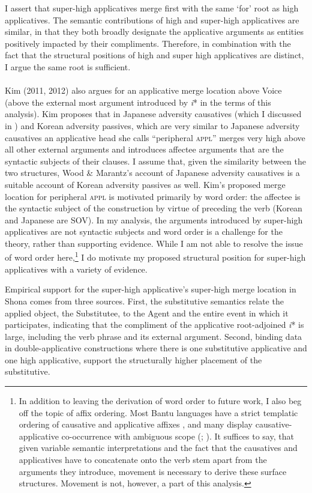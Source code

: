 \documentclass[output=paper,modfonts,nonflat]{langsci/langscibook}
\begin{document}
I assert that super-high applicatives merge first with the same ‘for’ root as high applicatives. The semantic contributions of high and super-high applicatives are similar, in that they both broadly designate the applicative arguments as entities positively impacted by their compliments. Therefore, in combination with the fact that the structural positions of high and super high applicatives are distinct, I argue the same root is sufficient.\\
\\
Kim (2011, 2012) also argues for an applicative merge location above Voice (above the external most argument introduced by \textit{i}* in the terms of this analysis). Kim proposes that in Japanese adversity causatives (which I discussed in ) and Korean adversity passives, which are very similar to Japanese adversity causatives an applicative head she calls “peripheral \textsc{appl}” merges very high above all other external arguments and introduces affectee arguments that are the syntactic subjects of their clauses. I assume that, given the similarity between the two structures, Wood \& Marantz’s account of Japanese adversity causatives is a suitable account of Korean adversity passives as well. Kim’s proposed merge location for peripheral \textsc{appl} is motivated primarily by word order: the affectee is the syntactic subject of the construction by virtue of preceding the verb (Korean and Japanese are SOV). In my analysis, the arguments introduced by super-high applicatives are not syntactic subjects and word order is a challenge for the theory, rather than supporting evidence. While I am not able to resolve the issue of word order here,\footnote{In addition to leaving the derivation of word order to future work, I also beg off the topic of affix ordering. Most Bantu languages have a strict templatic ordering of causative and applicative affixes \citep{Good2005}, and many display causative-applicative co-occurrence with ambiguous scope (\citealt{Baker1985}; \citealt{Hyman2002}). It suffices to say, that given variable semantic interpretations and the fact that the causatives and applicatives have to concatenate onto the verb stem apart from the arguments they introduce, movement is necessary to derive these surface structures. Movement is not, however, a part of this analysis.}  I do motivate my proposed structural position for super-high applicatives with a variety of evidence. 



Empirical support for the super-high applicative’s super-high merge location in Shona comes from three sources. First, the substitutive semantics relate the applied object, the Substitutee, to the Agent and the entire event in which it participates, indicating that the compliment of the applicative root-adjoined \textit{i}* is large, including the verb phrase and its external argument.  Second, binding data in double-applicative constructions where there is one substitutive applicative and one high applicative, support the structurally higher placement of the substitutive. 
\end{document}
